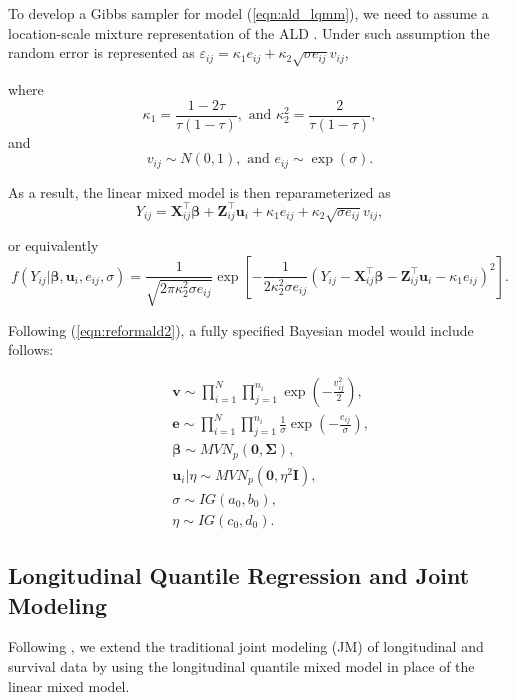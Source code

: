 To develop a Gibbs sampler for model (\ref{eqn:ald_lqmm}), we need to assume a location-scale mixture representation of the ALD \citep{kotz2001laplace}. Under such assumption the random error is represented as $\varepsilon_{ij}=\kappa_1e_{ij}+\kappa_2\sqrt{\sigma e_{ij}}v_{ij}$,

where \[\kappa_1=\frac{1-2\tau}{\tau(1-\tau)}, \mbox{ and } \kappa_2^2=\frac{2}{\tau(1-\tau)},\]
and \[v_{ij}\sim N(0,1), \mbox{ and } e_{ij}\sim\exp(\sigma).\]

As a result, the linear mixed model is then reparameterized as
\begin{equation}\label{eqn:reformald2}
Y_{ij}={\boldsymbol X}_{ij}^{\top}\boldsymbol{\beta}+{\boldsymbol Z}_{ij}^{\top}\boldsymbol{u}_i+\kappa_1e_{ij}+\kappa_2\sqrt{\sigma e_{ij}}v_{ij},
\end{equation}


or equivalently
\begin{equation}\label{eqn:lo_sc_lh}
f(Y_{ij}|\boldsymbol{\beta},\boldsymbol{u}_i,e_{ij},\sigma)=\frac{1}{\sqrt{2\pi\kappa_2^2\sigma e_{ij}}}\exp\left[-\frac{1}{2\kappa_2^2\sigma e_{ij}}(Y_{ij}-{\boldsymbol X}_{ij}^{\top}\boldsymbol{\beta}-{\boldsymbol Z}_{ij}^{\top}\boldsymbol{u}_i-\kappa_1e_{ij})^2\right].
\end{equation}


Following (\ref{eqn:reformald2}), a fully specified Bayesian model would include follows:

\begin{eqnarray*}
&& {\boldsymbol v}\sim\prod_{i=1}^N\prod_{j=1}^{n_i}\exp\left(-\frac{v_{ij}^2}{2}\right),\\
&& {\boldsymbol e}\sim\prod_{i=1}^N\prod_{j=1}^{n_i}\frac{1}{\sigma}\exp\left(-\frac{e_{ij}}{\sigma}\right),\\
&& \boldsymbol{\beta} \sim MVN_p({\boldsymbol 0}, \boldsymbol{\Sigma}),\\
&& \boldsymbol{u}_i|\eta \sim MVN_p({\boldsymbol 0}, \eta^2\boldsymbol{I}),\\
&& \sigma\sim IG(a_0, b_0),\\
&& \eta\sim IG(c_0, d_0).
\end{eqnarray*}



\subsection{Longitudinal Quantile Regression and Joint Modeling}
Following \cite{Alessio2014qrjm}, we extend the traditional joint modeling (JM) of longitudinal and survival data by using the longitudinal quantile mixed model in place of the linear mixed model.\par

